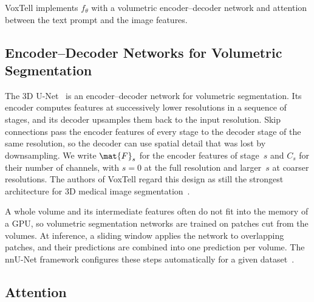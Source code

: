 VoxTell implements $f_\theta$ with a volumetric encoder--decoder network and attention between the text prompt and the image features.

\subsection{Encoder--Decoder Networks for Volumetric Segmentation}
\label{subsec:bg-unet}

The 3D U-Net~\cite{3d_unet} is an encoder--decoder network for volumetric segmentation.
Its encoder computes features at successively lower resolutions in a sequence of stages, and its decoder upsamples them back to the input resolution.
Skip connections pass the encoder features of every stage to the decoder stage of the same resolution, so the decoder can use spatial detail that was lost by downsampling.
We write $\mat{F}_s$ for the encoder features of stage~$s$ and $C_s$ for their number of channels, with $s = 0$ at the full resolution and larger~$s$ at coarser resolutions.
The authors of VoxTell regard this design as still the strongest architecture for 3D medical image segmentation~\cite[Sec.~3]{rokuss2025voxtellfreetextpromptableuniversal}.

A whole volume and its intermediate features often do not fit into the memory of a GPU, so volumetric segmentation networks are trained on patches cut from the volumes.
At inference, a sliding window applies the network to overlapping patches, and their predictions are combined into one prediction per volume.
The nnU-Net framework configures these steps automatically for a given dataset~\cite{isensee2018nnunetselfadaptingframeworkunetbased}.

\subsection{Attention}
\label{subsec:bg-attention}

